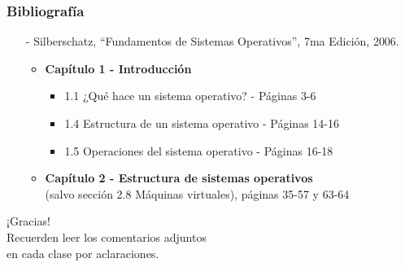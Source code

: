 \documentclass[aspectratio=169]{beamer}
\begin{document}
\begin{frame}[fragile,c]
    \frametitle{Bibliografía}
    \begin{itemize}
        \setlength\itemsep{0.5cm}
        \item[-] \small Silberschatz, ``Fundamentos de Sistemas Operativos'', 7ma Edición, 2006.\\
        \vspace{0.4cm}
        \begin{itemize}
            \setlength\itemsep{0.5cm}
            \item \textbf{Capítulo 1 - Introducción}
            \begin{itemize}
                \setlength\itemsep{0.2cm}
                \item 1.1 ¿Qué hace un sistema operativo? - Páginas 3-6
                \item 1.4 Estructura de un sistema operativo - Páginas 14-16
                \item 1.5 Operaciones del sistema operativo - Páginas 16-18
            \end{itemize}
            \item \textbf{Capítulo 2 - Estructura de sistemas operativos}\\ (salvo sección 2.8 Máquinas virtuales), páginas 35-57 y 63-64
        \end{itemize}
    \end{itemize}
\end{frame}

\begin{frame}[plain]
    \begin{center}
    \vspace{2cm}
    \huge ¡Gracias!\\
    \vspace{2cm}
    \normalsize Recuerden leer los comentarios adjuntos\\ en cada clase por aclaraciones.
    \end{center}
\end{frame}
\end{document}
